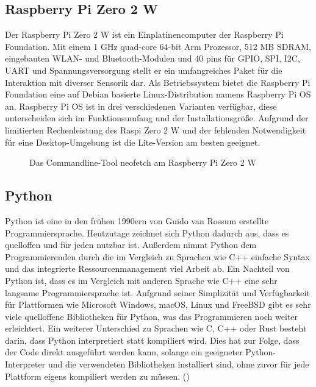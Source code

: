 \subsection{Raspberry Pi Zero 2 W}
\label{subsec:tRasPi}
Der Raspberry Pi Zero 2 W ist ein Einplatinencomputer der Raspberry Pi Foundation. Mit einem 1 \ac{GHz} quad-core 64-bit Arm Prozessor, 512 \ac{MB} \ac{SDRAM}, eingebauten \ac{WLAN}- und Bluetooth-Modulen und 40 pins für \ac{GPIO}, \ac{SPI}, \ac{I2C}, \ac{UART} und Spannungsversorgung stellt er ein umfangreiches Paket für die Interaktion mit diverser Sensorik dar. Als Betriebssystem bietet die Raspberry Pi Foundation eine auf Debian basierte Linux-Distribution namens Raspberry Pi \ac{OS} an. Raspberry Pi \ac{OS} ist in drei verschiedenen Varianten verfügbar, diese unterscheiden sich im Funktionsumfang und der Installationsgröße. Aufgrund der limitierten Rechenleistung des \ac{Raspi} Zero 2 W und der fehlenden Notwendigkeit für eine Desktop-Umgebung ist die Lite-Version am besten geeignet.
\begin{figure}[h]
\centering
\missingfigure{}
\caption{Das Commandline-Tool neofetch am Raspberry Pi Zero 2 W}
\label{fig:pineofetch}
\end{figure}

\subsection{Python}
\label{subsec:tPython}
Python ist eine in den frühen 1990ern von Guido van Rossum erstellte Programmiersprache. Heutzutage zeichnet sich Python dadurch aus, dass es quelloffen und für jeden nutzbar ist. Außerdem nimmt Python dem Programmierenden durch die im Vergleich zu Sprachen wie C++ einfache Syntax und das integrierte Ressourcenmanagement viel Arbeit ab. Ein Nachteil von Python ist, dass es im Vergleich mit anderen Sprache wie C++ eine sehr langsame Programmiersprache ist. Aufgrund seiner Simplizität und Verfügbarkeit für Plattformen wie Microsoft Windows, macOS, Linux und FreeBSD gibt es sehr viele quelloffene Bibliotheken für Python, was das Programmieren noch weiter erleichtert. Ein weiterer Unterschied zu Sprachen wie C, C++ oder Rust besteht darin, dass Python interpretiert statt kompiliert wird. Dies hat zur Folge, dass der Code direkt ausgeführt werden kann, solange ein geeigneter Python-Interpreter und die verwendeten Bibliotheken installiert sind, ohne zuvor für jede Plattform eigens kompiliert werden zu müssen.
(\cite{matthes-2019})

